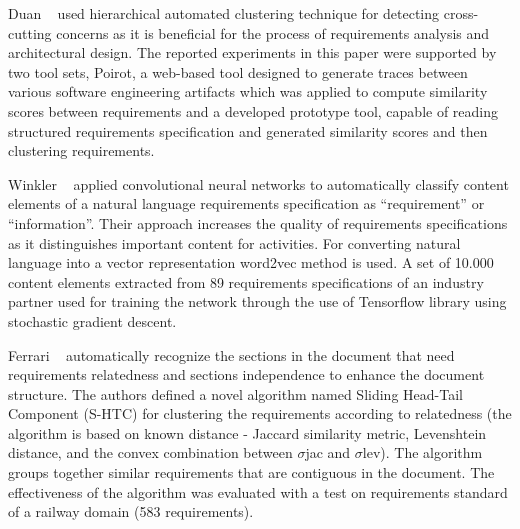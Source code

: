 Duan \etal~\cite{Duan:2007} used hierarchical automated clustering technique for
detecting cross-cutting concerns as it is beneficial for the process of
requirements analysis and architectural design. The reported experiments in this
paper were supported by two tool sets, Poirot, a web-based tool designed to
generate traces between various software engineering artifacts which was applied
to compute similarity scores between requirements and a developed prototype
tool, capable of reading structured requirements specification and generated
similarity scores and then clustering requirements.

Winkler \etal~\cite{Winkler:2016} applied convolutional neural networks to
automatically classify content elements of a natural language requirements
specification as “requirement” or “information”. Their approach increases the quality of requirements
specifications as it distinguishes important content for activities. For
converting natural language into a vector representation word2vec method is
used. A set of 10.000 content elements extracted from 89 requirements
specifications of an industry partner used for training the network through the
use of Tensorflow library using stochastic gradient descent.

 Ferrari \etal~\cite{Ferrari:2013} automatically recognize
the sections in the document that need requirements relatedness and sections
independence to enhance the document structure. The authors defined a
novel algorithm named Sliding Head-Tail Component (S-HTC) for clustering the
requirements according to relatedness (the algorithm is based on known distance
- Jaccard similarity metric, Levenshtein distance, and the convex combination
between $\sigma$jac and $\sigma$lev). The algorithm groups together similar
requirements that are contiguous in the document. The effectiveness
of the algorithm was evaluated with a test on requirements standard of a railway
domain (583 requirements).

